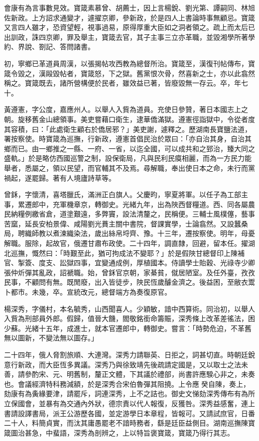 \begin{pinyinscope}
會康有為言事數見效。寶箴素慕曾、胡薦士，因上言楊銳、劉光第、譚嗣同、林旭佐新政。上方詔求通變才，遽擢京卿，參新政，於是四人上書論時事無顧忌。寶箴又言四人雖才，恐資望輕，視事過易，原得厚重大臣如之洞者領之。疏上而太后已出訓政，誅四京卿，罪及舉主，寶箴去官，其子主事三立亦革職，並毀湘學所著學約、界說、劄記、答問諸書。

初，寧鄉已革道員周漢，以張揭帖攻西教為總督所治。寶箴至，漢復刊帖傳布，寶箴令毀之，漢毆毀帖者，寶箴怒，下之獄。舊黨恨次骨，然喜新之士，亦以此翕然稱之。寶箴既去，諸所營構便於民者，雖效益已著，皆廢毀無一存云。卒，年七十。

黃遵憲，字公度，嘉應州人。以舉人入貲為道員。充使日參贊，著日本國志上之朝。旋移舊金山總領事。美吏嘗藉口衛生，逮華僑滿獄。遵憲徑詣獄中，令從者度其容積，曰：「此處衛生顧右於僑居邪？」美吏謝，遽釋之。歷湖南長寶鹽法道，署按察使。時寶箴為巡撫，行新政，遵憲首倡民治於眾曰：「亦自治其身，自治其鄉而已。由一鄉推之一縣、一府、一省，以迄全國，可以成共和之郅治，臻大同之盛軌。」於是略仿西國巡警之制，設保衛局，凡與民利民瘼相麗，而為一方民力能舉者，悉屬之，領以民望，而官輔其不及焉。尋解職，奉出使日本之命，未行而黨禍起，遂罷歸。著有人境廬詩草等。

曾鉌，字懷清，喜塔臘氏，滿洲正白旗人。父慶昀，寧夏將軍。以任子為工部主事，累遷郎中，充軍機章京，轉御史。光緒九年，出為陜西督糧道。西、同各屬農民納糧例繳省倉，道塗艱遠，多弊竇，設法清釐之，民稱便。三輔士風樸僿，藝事苦窳，延長安柏景偉、咸陽劉光蕡主關中書院，督課實學，士論翕然。又設蠶桑局，聘織師教以煮湅織染法，歲出絲帛埒齊、豫。十三年，遷按察使。明年，母憂解職。服除，起故官，俄遷甘肅布政使。二十四年，調直隸，回避，留本任。擢湖北巡撫，慨然曰：「時艱至此，猶可拘成法不變耶？」於是假陜甘總督印上陳補官、掣簽、度支、訟獄四事，宜變通成例，厚植國本。侍讀學士貽穀、光祿寺少卿張仲炘彈其亂政，詔褫職。始，曾鉌官京朝，家綦貧，僦居陋室。及任外臺，孜孜民事，不顧問有無。既閒廢，出入皆徒步，陜民恆歲醵金濟之。後益困，至敝衣鬻卜都市。未幾，卒。宣統改元，總督端方為奏復原官。

楊深秀，字儀村，本名毓秀，山西聞喜人。少穎敏，諳中西算術。同治初，以舉人入貲為刑部員外郎。假歸，值晉大饑，閻敬銘銜命籌賑，深秀條上改革差徭法，困少蘇。光緒十五年，成進士，就本官遷郎中，轉御史。嘗言：「時勢危迫，不革舊無以圖新，不變法無以圖存。」

二十四年，俄人脅割旅順、大連灣。深秀力請聯英、日拒之，詞甚切直。時朝廷銳意行新政，而大臣恆多異議。深秀乃與徐致靖先後疏請定國是，又以取士之法未善，請參酌宋、元、明舊制，釐正文體，下其議於禮部，尚書許應騤心非之，未奏也。會議經濟特科務減額，於是深秀合宋伯魯彈其阻撓。上令應癸自陳，奏上，劾康有為夤緣要津，請罷斥，詞連深秀，上不之詰也。御史文悌劾深秀傳布有為所立保國會，並暴有為交通內外狀，德宗責以代人報復，反獲咎。深秀益感奮，連上書請設譯書局，派王公游歷各國，並定游學日本章程，皆報可。又請試庶官，日番二十人，料簡貞實，而汰其庸愚罷老不諳時務者，繇是廷臣益側目。湖南巡撫陳寶箴圖治甚急，中蜚語，深秀為剖辨之，上以特旨褒寶箴，寶箴乃得行其志。


\end{pinyinscope}
